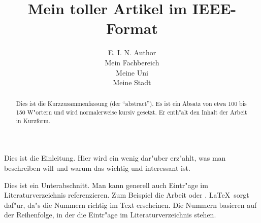 \documentclass[10pt,twocolumn]{article}
\begin{document}
\title{Mein toller Artikel im IEEE-Format}

\author{E. I. N. Author \\
  Mein Fachbereich \\
  Meine Uni \\
  Meine Stadt}
 

\maketitle

\thispagestyle{empty}%



\begin{abstract}
  
  Dies ist die Kurzzusammenfassung (der ``abstract''). Es ist
  ein Absatz von etwa 100 bis 150 W"ortern und wird normalerweise
  kursiv gesetzt. Er enth"alt den Inhalt der Arbeit in Kurzform.

\end{abstract}

{}

Dies ist die Einleitung. Hier wird ein wenig dar"uber erz"ahlt, was man
beschreiben will und warum das wichtig und interessant ist.


Dies ist ein Unterabschnitt. Man kann generell auch Eintr"age im
Literaturverzeichnis referenzieren. Zum Beispiel die Arbeit
\cite{key:foo} oder \cite{foo:baz}. \LaTeX\ sorgt daf"ur, da"s die
Nummern richtig im Text erscheinen.  Die Nummern basieren auf der
Reihenfolge, in der die Eintr"age im Literaturverzeichnis stehen.
\end{document}
